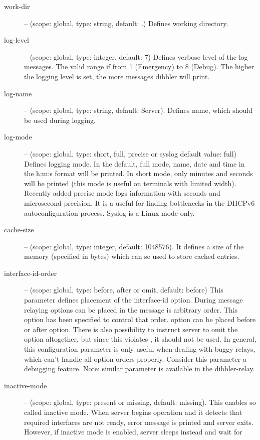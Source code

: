 \begin{description}
 \item[work-dir] -- (scope: global, type: string, default: .) Defines working
	    directory.
 \item[log-level] -- (scope: global, type: integer, default: 7) Defines
	    verbose level of the log messages. The valid range if
	    from 1 (Emergency) to 8 (Debug). The higher the logging
	    level is set, the more messages dibbler will print.
 \item[log-name] -- (scope: global, type: string, default: Server). Defines
	    name, which should be used during logging.
 \item[log-mode] -- (scope: global, type: short, full, precise or syslog
	    default value: full) Defines logging mode. In the
	    default, full mode, name, date and time in the h:m:s format
	    will be printed. In short mode, only minutes and
	    seconds will be printed (this mode is useful on
	    terminals with limited width). Recently added precise
	    mode logs information with seconds and microsecond
	    precision. It is a useful for finding bottlenecks in
	    the DHCPv6 autoconfiguration process. Syslog is a Linux
	    mode only.
 \item[cache-size] -- (scope: global, type: integer, default:
	    1048576). It defines a size of the memory (specified in
	    bytes) which can se used to store cached entries.
\item[interface-id-order] -- (scope: global, type: before, after or omit,
	default: before) This parameter defines placement of the
	interface-id option. During message relaying options can be placed in the 
	message is arbitrary order. This option has been specified to control
	that order.  option can be placed before or after
	 option. There is also possibility to instruct
	server to omit the  option altogether, but since
	this violates \cite{rfc3315}, it should not be used. In general, this
	configuration parameter is only useful when dealing with buggy relays,
	which can't handle all option orders properly. Consider this parameter
	a debugging feature. Note: similar parameter is available in the dibbler-relay.
\item[inactive-mode] -- (scope: global, type: present or missing,
  default: missing). This enables so called inactive mode. When server
  begins operation and it detects that required interfaces are not
  ready, error message is printed and server exits. However, if
  inactive mode is enabled, server sleeps instead and wait for

\end{description}
